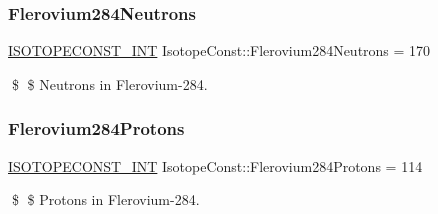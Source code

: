 \subsubsection{\texorpdfstring{Flerovium284\+Neutrons}{Flerovium284Neutrons}}
{\footnotesize\ttfamily \mbox{\hyperlink{group___isotope_const-_macros_ga5f18360b3e99483a35c32d789e62621c}{I\+S\+O\+T\+O\+P\+E\+C\+O\+N\+S\+T\+\_\+\+I\+NT}} Isotope\+Const\+::\+Flerovium284\+Neutrons = 170}

\$ \$ Neutrons in Flerovium-\/284. \mbox{\label{group___isotope_const-_flerovium-_fl284_gaf5647f44beddf51aafad69c13a3ea552}} 
\subsubsection{\texorpdfstring{Flerovium284\+Protons}{Flerovium284Protons}}
{\footnotesize\ttfamily \mbox{\hyperlink{group___isotope_const-_macros_ga5f18360b3e99483a35c32d789e62621c}{I\+S\+O\+T\+O\+P\+E\+C\+O\+N\+S\+T\+\_\+\+I\+NT}} Isotope\+Const\+::\+Flerovium284\+Protons = 114}

\$ \$ Protons in Flerovium-\/284. 